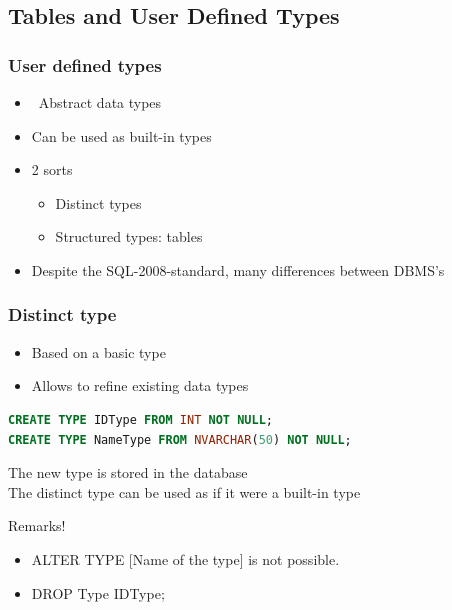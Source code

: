 \documentclass{report}
\begin{document}
    \subsection{Tables and User Defined Types}
    \subsubsection{User defined types}
    \begin{itemize}
        \item ~Abstract data types
        \item Can be used as built-in types
        \item 2 sorts
        \begin{itemize}
            \item Distinct types
            \item Structured types: tables
        \end{itemize}
        \item Despite the SQL-2008-standard, many differences between DBMS's
    \end{itemize}
    
    \subsubsection{Distinct type}
    \begin{itemize}
        \item Based on a basic type
        \item Allows to refine existing data types
    \end{itemize}
    
\begin{lstlisting}[language=SQL]
CREATE TYPE IDType FROM INT NOT NULL;
CREATE TYPE NameType FROM NVARCHAR(50) NOT NULL;
\end{lstlisting}
    The new type is stored in the database\\
    The distinct type can be used as if it were a built-in type
    
    Remarks!\\
    \begin{itemize}
        \item ALTER TYPE [Name of the type] is not possible.
        \item DROP Type IDType;
    \end{itemize}
\end{document}
